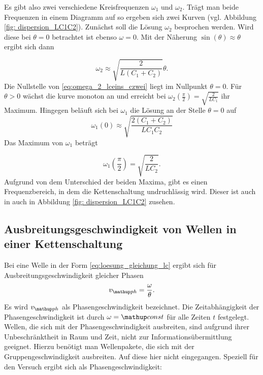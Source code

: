 Es gibt also zwei verschiedene Kreisfrequenzen $\omega_1$ und $\omega_2$.
Trägt man beide Frequenzen in einem Diagramm auf so ergeben sich %
zwei Kurven (vgl. Abbildung \ref{fig: dispersion_LC1C2}).
Zunächst soll die Lösung $\omega_2$ besprochen werden.
Wird diese bei $\theta=0$ betrachtet ist ebenso $\omega=0$.
Mit der Näherung $\sin(\theta)\approx\theta$ ergibt sich dann

\begin{equation}
\label{eq:omega_2_lceins_czwei}
\omega_2\approx\sqrt{\frac{2}{L\left(C_1+C_2\right)}}\theta.
\end{equation}
Die Nullstelle von \eqref{eq:omega_2_lceins_czwei} liegt im Nullpunkt $\theta=0$.
Für $\theta>0$ wächst die kurve monoton an und erreicht bei $\omega_2(\frac{\pi}{2})=\sqrt{\frac{2}{LC_1}}$
ihr Maximum. \newline
Hingegen beläuft sich bei $\omega_1$ die Lösung an der Stelle $\theta=0$ auf
\begin{equation*}
\omega_1(0)\approx\sqrt{\frac{2(C_1+C_2)}{LC_1C_2}}
\end{equation*}
Das Maximum von $\omega_1$ beträgt

\begin{equation}
\label{eq:max_omega_1_ceins_czwei}
\omega_1(\frac{\pi}{2})=\sqrt{\frac{2}{LC_2}}.
\end{equation}
Aufgrund von dem Unterschied der beiden Maxima, gibt es einen Frequenzbereich, in dem %
die Kettenschaltung undruchlässig wird. Dieser ist auch in auch in Abbildung \ref{fig: dispersion_LC1C2} %
zusehen.

\subsection{Ausbreitungsgeschwindigkeit von Wellen in einer Kettenschaltung}
Bei eine Welle in der Form \eqref{eq:loesung_gleichung_lc} %
ergibt sich für Ausbreitungsgeschwindigkeit gleicher Phasen %
\begin{equation*}
v\ua{ph}=\frac{\omega}{\theta}.
\end{equation*}
Es wird $v\ua{ph}$ als Phasengeschwindigkeit bezeichnet.
Die Zeitabhängigkeit der Phasengeschwindigkeit ist durch $\omega=\map{const}$
für alle Zeiten $t$ festgelegt. Wellen, die sich mit der Phasengeschwindigkeit
ausbreiten, sind aufgrund ihrer Unbeschränktheit in Raum und Zeit, nicht zur %
Informationsübermittlung geeignet. Hierzu benötigt man Wellenpakete, die sich
mit der Gruppengeschwindigkeit ausbreiten. Auf diese hier nicht eingegangen. %
Speziell für den Versuch ergibt sich als Phasengeschwindigkeit:

